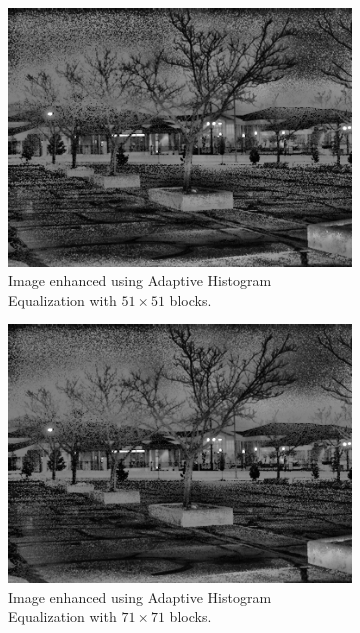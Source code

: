 \documentclass[a4paper, landscape]{article}
\begin{document}
\begin{figure}
    \centering
    \begin{subfigure}{0.32\linewidth}
        \centering
        \includegraphics[width=\linewidth]{big_enhanced_LC1.png}
        \caption{Image enhanced using Adaptive Histogram Equalization with $51\times 51$ blocks.}
    \end{subfigure}
    \begin{subfigure}{0.32\linewidth}
        \centering
        \includegraphics[width=\linewidth]{chonky_enhanced_LC1.png}
        \caption{Image enhanced using Adaptive Histogram Equalization with $71\times 71$ blocks.}
    \end{subfigure}
    \begin{subfigure}{0.32\linewidth}

\end{subfigure}
\end{figure}
\end{document}
